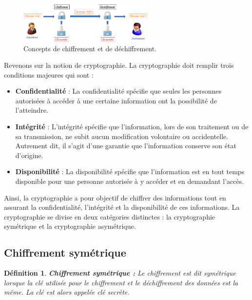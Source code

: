 \documentclass[oneside]{book}
\newtheorem{definition}{Définition}[section]
\begin{document}
\begin{figure}[htbp]
    \centering
    \includegraphics[width=0.6\textwidth]{image/fondamentaux_crypto}
    \caption{Concepts de chiffrement et de déchiffrement.}
    \label{fig:fondamentaux_crypto}
\end{figure}


\hspace{-0.5cm}Revenons sur la notion de cryptographie. La cryptographie doit remplir trois conditions majeures qui sont :
\begin{itemize}
\item \textbf{Confidentialité} : La confidentialité spécifie que seules les personnes autorisées à accéder à une certaine information ont la possibilité de l'atteindre.
\item \textbf{Intégrité} : L'intégrité spécifie que l'information, lors de son traitement ou de sa transmission, ne subit aucun modification volontaire ou accidentelle. Autrement dit, il s'agit d'une garantie que l'information conserve son état d'origine.
\item \textbf{Disponibilité} : La disponibilité spécifie que l'information est en tout temps disponible pour une personne autorisée à y accéder et en demandant l'accès. \\
\end{itemize}

Ainsi, la cryptographie a pour objectif de chiffrer des informations tout en assurant la confidentialité, l'intégrité et la disponibilité de ces informations. La cryptographie se divise en deux catégories distinctes : la cryptographie symétrique et la cryptographie asymétrique. 

\subsection{Chiffrement symétrique}
\label{subsec:Chiffrement_symétrique}

\theoremstyle{definition}
\begin{definition}{\textbf{Chiffrement symétrique :}}
Le chiffrement est dit symétrique lorsque la clé utilisée pour le chiffrement et le déchiffrement des données est la même. La clé est alors appelée \textit{clé secrète}. 
\end{definition}
\end{document}
